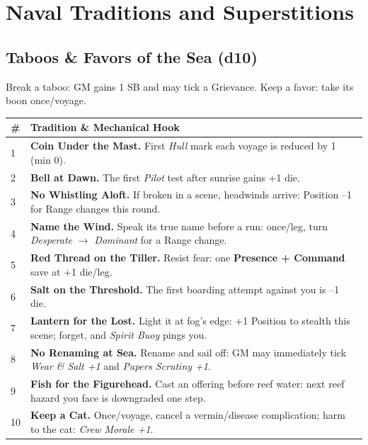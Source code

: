 \documentclass[11pt,oneside]{book}
\begin{document}
\section{Naval Traditions and Superstitions}

\subsection*{Taboos \& Favors of the Sea (d10)}
Break a taboo: GM gains 1 SB and may tick a Grievance. Keep a favor: take its boon once/voyage.

\begin{tabularx}{\linewidth}{@{}p{0.7cm} X@{}}
\toprule
\# & \textbf{Tradition \& Mechanical Hook}\\
\midrule
1 & \textbf{Coin Under the Mast.} First \textit{Hull} mark each voyage is reduced by 1 (min 0).\\
2 & \textbf{Bell at Dawn.} The first \emph{Pilot} test after sunrise gains +1 die.\\
3 & \textbf{No Whistling Aloft.} If broken in a scene, headwinds arrive: Position --1 for Range changes this round.\\
4 & \textbf{Name the Wind.} Speak its true name before a run: once/leg, turn \emph{Desperate} $\rightarrow$ \emph{Dominant} for a Range change.\\
5 & \textbf{Red Thread on the Tiller.} Resist fear: one \textbf{Presence + Command} save at +1 die/leg.\\
6 & \textbf{Salt on the Threshold.} The first boarding attempt against you is --1 die.\\
7 & \textbf{Lantern for the Lost.} Light it at fog's edge: +1 Position to stealth this scene; forget, and \textit{Spirit Buoy} pings you.\\
8 & \textbf{No Renaming at Sea.} Rename and sail off: GM may immediately tick \textit{Wear \& Salt +1} and \textit{Papers Scrutiny +1}.\\
9 & \textbf{Fish for the Figurehead.} Cast an offering before reef water: next reef hazard you face is downgraded one step.\\
10 & \textbf{Keep a Cat.} Once/voyage, cancel a vermin/disease complication; harm to the cat: \textit{Crew Morale +1}.\\
\bottomrule
\end{tabularx}

\end{document}
